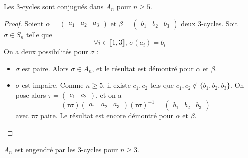 






  \begin{lemma}
    \label{simplicite-du-groupe-alterne-1}
    Les $3$-cycles sont conjugués dans $A_n$ pour $n \geq 5$.
  \end{lemma}

  \begin{proof}
    Soient $\alpha = \begin{pmatrix} a_1 & a_2 & a_3 \end{pmatrix}$ et $\beta = \begin{pmatrix} b_1 & b_2 & b_3 \end{pmatrix}$ deux $3$-cycles. Soit $\sigma \in S_n$ telle que
    \[ \forall i \in \llbracket 1, 3 \rrbracket, \, \sigma(a_i) = b_i \]
    On a deux possibilités pour $\sigma$ :
    \begin{itemize}
      \item $\sigma$ est paire. Alors $\sigma \in A_n$, et le résultat est démontré pour $\alpha$ et $\beta$.
      \item $\sigma$ est impaire. Comme $n \geq 5$, il existe $c_1, c_2$ tels que $c_1, c_2 \notin \{ b_1, b_2, b_3 \}$. On pose alors $\tau = \begin{pmatrix} c_1 & c_2 \end{pmatrix}$, et on a
      \[ (\tau\sigma) \begin{pmatrix} a_1 & a_2 & a_3 \end{pmatrix} (\tau\sigma)^{-1} = \begin{pmatrix} b_1 & b_2 & b_3 \end{pmatrix} \]
      avec $\tau\sigma$ paire. Le résultat est encore démontré pour $\alpha$ et $\beta$.
    \end{itemize}
  \end{proof}


  \begin{lemma}
    \label{simplicite-du-groupe-alterne-2}
    $A_n$ est engendré par les $3$-cycles pour $n \geq 3$.
  \end{lemma}


